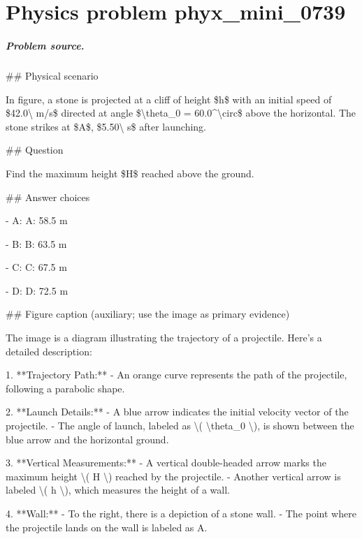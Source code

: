 
\chapter{Physics problem phyx\_mini\_0739}
\label{ch:PhyXMiniProblems_problem_phyx_mini_0739}

\paragraph{Problem source.}
\#\# Physical scenario

In figure, a stone is projected at a cliff of height \$h\$ with an initial speed of \$42.0\textbackslash{} m/s\$ directed at angle \$\textbackslash{}theta\_0 = 60.0\textasciicircum{}\textbackslash{}circ\$ above the horizontal. The stone strikes at \$A\$, \$5.50\textbackslash{} s\$ after launching.

\#\# Question

Find the maximum height \$H\$ reached above the ground.

\#\# Answer choices

- A: A: 58.5 m

- B: B: 63.5 m

- C: C: 67.5 m

- D: D: 72.5 m

\#\# Figure caption (auxiliary; use the image as primary evidence)

The image is a diagram illustrating the trajectory of a projectile. Here's a detailed description:

1. **Trajectory Path:**
   - An orange curve represents the path of the projectile, following a parabolic shape.

2. **Launch Details:**
   - A blue arrow indicates the initial velocity vector of the projectile.
   - The angle of launch, labeled as \textbackslash{}( \textbackslash{}theta\_0 \textbackslash{}), is shown between the blue arrow and the horizontal ground.

3. **Vertical Measurements:**
   - A vertical double-headed arrow marks the maximum height \textbackslash{}( H \textbackslash{}) reached by the projectile.
   - Another vertical arrow is labeled \textbackslash{}( h \textbackslash{}), which measures the height of a wall.

4. **Wall:**
   - To the right, there is a depiction of a stone wall.
   - The point where the projectile lands on the wall is labeled as A.

